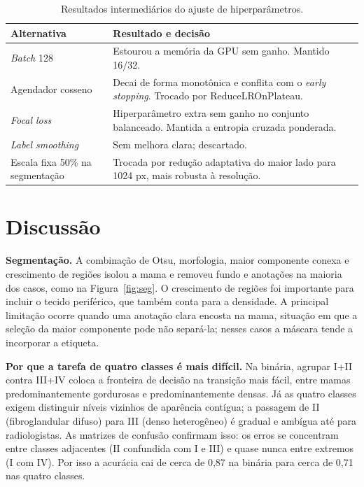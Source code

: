 \documentclass[twocolumn,a4paper,11pt]{article}
\begin{document}
\begin{table}[h]
\centering
\caption{Resultados intermediários do ajuste de hiperparâmetros.}
\label{tab:ajuste}
\small
\begin{tabular}{p{2.5cm}p{5.1cm}}
\toprule
\textbf{Alternativa} & \textbf{Resultado e decisão} \\
\midrule
\emph{Batch} 128 & Estourou a memória da GPU sem ganho. Mantido 16/32. \\
Agendador cosseno & Decai de forma monotônica e conflita com o \emph{early stopping}. Trocado por ReduceLROnPlateau. \\
\emph{Focal loss} & Hiperparâmetro extra sem ganho no conjunto balanceado. Mantida a entropia cruzada ponderada. \\
\emph{Label smoothing} & Sem melhora clara; descartado. \\
Escala fixa 50\% na segmentação & Trocada por redução adaptativa do maior lado para 1024 px, mais robusta à resolução. \\
\bottomrule
\end{tabular}
\end{table}

\section{Discussão}

\textbf{Segmentação.} A combinação de Otsu, morfologia, maior componente conexa e
crescimento de regiões isolou a mama e removeu fundo e anotações na maioria dos
casos, como na Figura~\ref{fig:seg}. O crescimento de regiões foi importante para
incluir o tecido periférico, que também conta para a densidade. A principal
limitação ocorre quando uma anotação clara encosta na mama, situação em que a
seleção da maior componente pode não separá\nobreakdash-la; nesses casos a máscara tende a
incorporar a etiqueta.

\textbf{Por que a tarefa de quatro classes é mais difícil.} Na binária, agrupar
I+II contra III+IV coloca a fronteira de decisão na transição mais fácil, entre
mamas predominantemente gordurosas e predominantemente densas. Já as quatro classes
exigem distinguir níveis vizinhos de aparência contígua; a passagem de II
(fibroglandular difuso) para III (denso heterogêneo) é gradual e ambígua até para
radiologistas. As matrizes de confusão confirmam isso: os erros se concentram entre
classes adjacentes (II confundida com I e III) e quase nunca entre extremos (I com
IV). Por isso a acurácia cai de cerca de 0,87 na binária para cerca de 0,71 nas
quatro classes.
\end{document}
